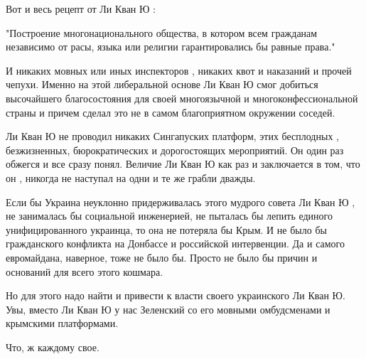 Вот и весь рецепт  от Ли Кван Ю : 

"Построение многонационального общества, в котором всем гражданам независимо от
расы, языка или религии гарантировались бы равные права." 

И никаких мовных или иных инспекторов , никаких квот и наказаний и прочей
чепухи.   Именно на этой либеральной  основе Ли Кван Ю смог добиться
высочайшего благосостояния для  своей многоязычной и многоконфессиональной
страны и причем  сделал это не в самом благоприятном окружении соседей.

Ли Кван Ю не проводил   никаких Сингапуских платформ, этих бесплодных ,
безжизненных, бюрократических и дорогостоящих мероприятий. Он один раз обжегся
и все сразу понял.  Величие Ли Кван Ю как раз и заключается в том, что он ,
никогда не наступал  на одни  и те же грабли дважды. 

Если бы Украина неуклонно  придерживалась  этого мудрого   совета Ли Кван Ю ,
не занималась  бы социальной инженерией,  не пыталась  бы лепить единого
унифицированного украинца, то она не потеряла бы Крым.   И не было бы
гражданского   конфликта  на Донбассе и российской интервенции.    Да и самого
евромайдана, наверное, тоже не было бы. Просто не было бы причин и оснований
для всего этого  кошмара.

Но для этого надо найти и  привести к власти своего украинского Ли Кван Ю.
Увы, вместо Ли Кван Ю  у нас Зеленский со его  мовными омбудсменами и
крымскими платформами. 

Что, ж каждому свое.
